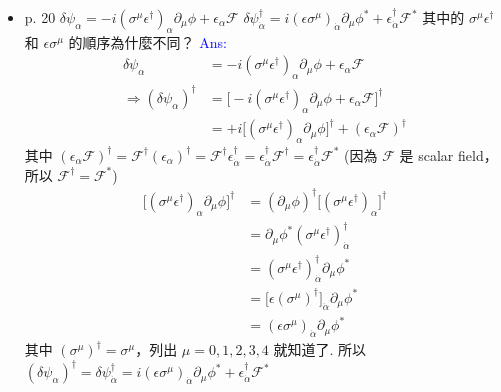 \documentclass[12pt, letterpaper]{article}
\begin{document}
\begin{itemize}
\item p. 20\newline
$\delta \psi_{\alpha} = - i (\sigma^{\mu} \epsilon^{\dag})_{\alpha} \partial_{\mu} \phi + \epsilon_{\alpha} \mathcal{F}$\newline
$\delta \psi^{\dag}_{\dot{\alpha}} = i (\epsilon \sigma^{\mu})_{\dot{\alpha}} \partial_{\mu} \phi^{*} + \epsilon^{\dag}_{\dot{\alpha}} \mathcal{F}^{*}$\newline
\newline
其中的 $\sigma^{\mu} \epsilon^{\dag}$ 和 $\epsilon \sigma^{\mu}$ 的順序為什麼不同？\newline
\textcolor{blue}{Ans:}
\begin{align*}
\delta \psi_{\alpha} &= - i (\sigma^{\mu} \epsilon^{\dag})_{\alpha} \partial_{\mu} \phi + \epsilon_{\alpha} \mathcal{F}\\
\Rightarrow
(\delta \psi_{\alpha})^{\dag} &= \big[ - i (\sigma^{\mu} \epsilon^{\dag})_{\alpha} \partial_{\mu} \phi + \epsilon_{\alpha} \mathcal{F} \big]^{\dag}\\
&= +i \big[ (\sigma^{\mu} \epsilon^{\dag})_{\alpha} \partial_{\mu} \phi \big]^{\dag} + (\epsilon_{\alpha} \mathcal{F})^{\dag}
\end{align*}
其中 $(\epsilon_{\alpha} \mathcal{F})^{\dag} = \mathcal{F}^{\dag} (\epsilon_{\alpha})^{\dag} = \mathcal{F}^{\dag} \epsilon^{\dag}_{\dot{\alpha}} = \epsilon^{\dag}_{\dot{\alpha}} \mathcal{F}^{\dag} = \epsilon^{\dag}_{\dot{\alpha}} \mathcal{F}^{*}$ (因為 $\mathcal{F}$ 是 scalar field，所以 $\mathcal{F}^{\dag} = \mathcal{F}^{*}$)
\begin{align*}
\big[ (\sigma^{\mu} \epsilon^{\dag})_{\alpha} \partial_{\mu} \phi \big]^{\dag}
&= (\partial_{\mu} \phi)^{\dag} \big[ (\sigma^{\mu} \epsilon^{\dag})_{\alpha} \big]^{\dag}\\
&= \partial_{\mu} \phi^{*} (\sigma^{\mu} \epsilon^{\dag})^{\dag}_{\dot{\alpha}}\\
&= (\sigma^{\mu} \epsilon^{\dag})^{\dag}_{\dot{\alpha}} \partial_{\mu} \phi^{*}\\
&= \big[ \epsilon (\sigma^{\mu})^{\dag} \big]_{\dot{\alpha}} \partial_{\mu} \phi^{*}\\
&= (\epsilon \sigma^{\mu})_{\dot{\alpha}} \partial_{\mu} \phi^{*}
\end{align*}
其中 $(\sigma^{\mu})^{\dag} = \sigma^{\mu}$，列出 $\mu = 0, 1, 2, 3, 4$ 就知道了.\newline
所以 $(\delta \psi_{\alpha})^{\dag} = \delta \psi^{\dag}_{\dot{\alpha}} = i (\epsilon \sigma^{\mu})_{\dot{\alpha}} \partial_{\mu} \phi^{*} + \epsilon^{\dag}_{\dot{\alpha}} \mathcal{F}^{*}$


\end{itemize}
\end{document}
